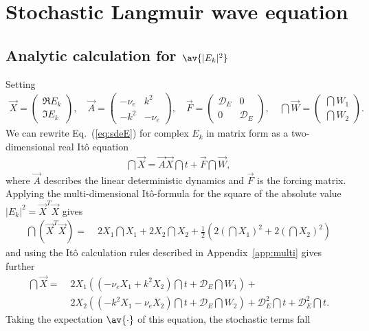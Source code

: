 \documentclass[10pt,a4paper]{article}
\newcommand{\eq}[1]{Eq.~(#1)}
\newcommand{\app}[1]{Appendix~#1}
\newcommand{\src}{\ensuremath{\mathcal{D}}}
\begin{document}
\section{Stochastic Langmuir wave equation}

\subsection{Analytic calculation for $\av{|E_k|^2}$}
\label{sec:avEa}
Setting 
\begin{align*}
\vec{X}=\left(\begin{array}{c}\Re{E_{k}}\\\Im{E_{k}}\end{array}\right),
\quad
\vec{A}=\left(\begin{array}{cc}{-}\nu_e&k^2\\{-}k^2&{-}\nu_e\end{array}\right),
\quad
\vec{F}=\left(\begin{array}{cc}\src_E&0\\0&\src_E\end{array}\right),
\quad
\dint{\vec{W}}=\left(\begin{array}{c}\dint{W_1}\\\dint{W_2}\end{array}\right).
\end{align*}
We can rewrite \eq{\ref{eq:sdeE}} for complex $E_k$ in matrix form as a two-dimensional real
Itô equation
\begin{align}
\dint{\vec{X}}=\vec{A}\vec{X}\dint{t}+\vec{F}\dint{\vec{W}},
\end{align}
where $\vec{A}$ describes the linear deterministic dynamics and $\vec{F}$ is the forcing
matrix.
Applying the multi-dimensional Itô-formula \citep{oksendal:2000} for the square of the
absolute value $|E_k|^ 2=\vec{X}^T\vec{X}$ gives
\begin{align}
\dint{(\vec{X}^T\vec{X})} = &\;
2X_1\dint{X_1}+2X_2\dint{X_2}+\frac{1}{2}\left(2(\dint{X_1})^2+2(\dint{X_2})^2\right)
\end{align}
and using the Itô calculation rules described in \app{\ref{app:multi}} gives further
\begin{align*}
\dint{\vec{X}}= &\;2X_1\left(\left(-\nu_eX_1{+}k^2X_2\right)\dint{t}+\src_E\dint{W_1}\right)+\\
&\;2X_2\left(\left({-}k^2X_1{-}\nu_eX_2\right)\dint{t}+\src_E\dint{W_2}\right)+
\src_E^2\dint{t}{+}\src_E^2\dint{t}.
\end{align*}
Taking the expectation $\av{\cdot}$ of this equation, the stochastic terms fall
\end{document}
